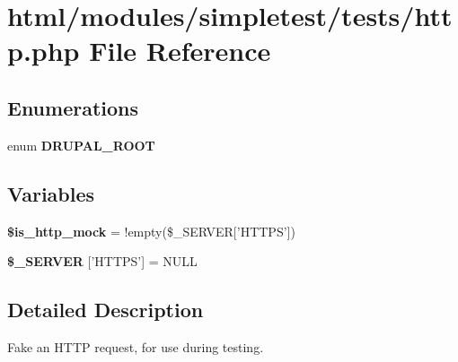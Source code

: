 \hypertarget{http_8php}{
\section{html/modules/simpletest/tests/http.php File Reference}
\label{http_8php}
}
\subsection*{Enumerations}
\begin{DoxyCompactItemize}
\item 
enum {\bfseries DRUPAL\_\-ROOT} 
\end{DoxyCompactItemize}
\subsection*{Variables}
\begin{DoxyCompactItemize}
\item 
\hypertarget{http_8php_a0c51dbd427c23b0cceb8c9f3a0c18426}{
{\bfseries \$is\_\-http\_\-mock} = !empty(\$\_\-SERVER\mbox{[}'HTTPS'\mbox{]})}
\label{http_8php_a0c51dbd427c23b0cceb8c9f3a0c18426}

\item 
\hypertarget{http_8php_a9c01e1c18bc40c852b36b1392f45f0f4}{
{\bfseries \$\_\-SERVER} \mbox{[}'HTTPS'\mbox{]} = NULL}
\label{http_8php_a9c01e1c18bc40c852b36b1392f45f0f4}

\end{DoxyCompactItemize}


\subsection{Detailed Description}
Fake an HTTP request, for use during testing. 